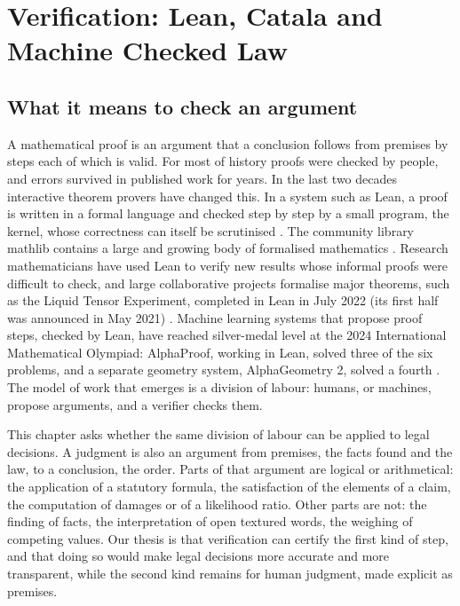 \chapter{Verification: Lean, Catala and Machine Checked Law}
\label{ch:lean}

\section{What it means to check an argument}

A mathematical proof is an argument that a conclusion follows from premises by steps each of which is valid. For most of history proofs were checked by people, and errors survived in published work for years. In the last two decades interactive theorem provers have changed this. In a system such as Lean, a proof is written in a formal language and checked step by step by a small program, the kernel, whose correctness can itself be scrutinised \citep{demoura2021}. The community library mathlib contains a large and growing body of formalised mathematics \citep{mathlib2020}. Research mathematicians have used Lean to verify new results whose informal proofs were difficult to check, and large collaborative projects formalise major theorems, such as the Liquid Tensor Experiment, completed in Lean in July 2022 (its first half was announced in May 2021) \citep{lte2022}. Machine learning systems that propose proof steps, checked by Lean, have reached silver-medal level at the 2024 International Mathematical Olympiad: AlphaProof, working in Lean, solved three of the six problems, and a separate geometry system, AlphaGeometry 2, solved a fourth \citep{deepmind2024}. The model of work that emerges is a division of labour: humans, or machines, propose arguments, and a verifier checks them.

This chapter asks whether the same division of labour can be applied to legal decisions. A judgment is also an argument from premises, the facts found and the law, to a conclusion, the order. Parts of that argument are logical or arithmetical: the application of a statutory formula, the satisfaction of the elements of a claim, the computation of damages or of a likelihood ratio. Other parts are not: the finding of facts, the interpretation of open textured words, the weighing of competing values. Our thesis is that verification can certify the first kind of step, and that doing so would make legal decisions more accurate and more transparent, while the second kind remains for human judgment, made explicit as premises.

